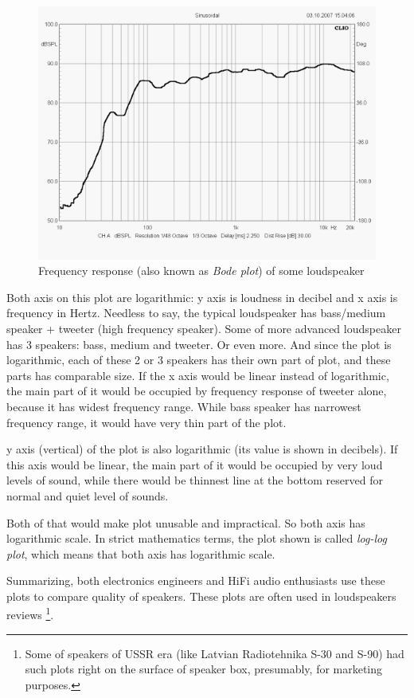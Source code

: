 \begin{figure}[H]
\centering
\includegraphics[scale=0.66]{log/65366.png}
\caption{Frequency response (also known as \textit{Bode plot}) of some loudspeaker}
\end{figure}

Both axis on this plot are logarithmic: y axis is loudness in decibel and x axis is frequency in Hertz.
Needless to say, the typical loudspeaker has bass/medium speaker + tweeter (high frequency speaker).
Some of more advanced loudspeaker has 3 speakers: bass, medium and tweeter.
Or even more.
And since the plot is logarithmic, each of these 2 or 3 speakers has their own part of plot, and these parts has comparable size.
If the x axis would be linear instead of logarithmic, the main part of it would be occupied by frequency response of tweeter alone, 
because it has widest frequency range. While bass speaker has narrowest frequency range, it would have very thin part of the plot.

y axis (vertical) of the plot is also logarithmic (its value is shown in decibels).
If this axis would be linear, the main part of it would be occupied by very loud levels of sound, while there would be thinnest line at the bottom
reserved for normal and quiet level of sounds.

Both of that would make plot unusable and impractical.
So both axis has logarithmic scale.
In strict mathematics terms, the plot shown is called \textit{log-log plot}, which means that both axis has logarithmic scale.

Summarizing, both electronics engineers and HiFi audio enthusiasts use these plots to compare quality of speakers.
These plots are often used in loudspeakers reviews
\footnote{Some of speakers of USSR era (like Latvian Radiotehnika S-30 and S-90) 
had such plots right on the surface of speaker box, presumably, for marketing purposes.}.

